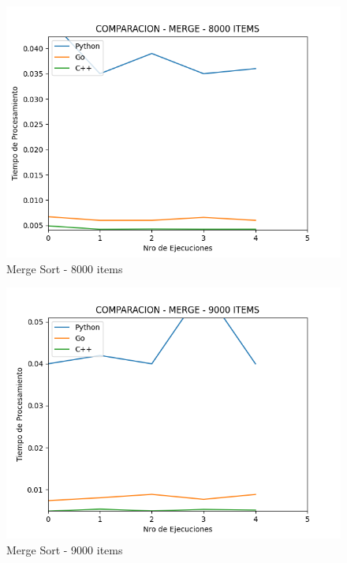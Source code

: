 \documentclass[12pt]{article} %
\begin{document}
    \begin{figure}[H]
    \centering
    \includegraphics[width=\textwidth]{merge_8000}
    \caption{Merge Sort - 8000 items}
    \end{figure}

    \vspace{5mm}
    
    \begin{figure}[H]
    \centering
    \includegraphics[width=\textwidth]{merge_9000}
    \caption{Merge Sort - 9000 items}
    \end{figure}

    \vspace{5mm}
    
\end{document}
